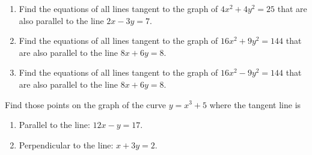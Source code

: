 \begin{embeddedproblem-enumerate}
  \begin{enumerate}[label={\bf{}(\alph*)}]
  \item Find the equations of all lines tangent to the graph of
    $4x^2+4y^2=25$ that are also parallel to the line $2x-3y=7$.\\
  \item   Find the equations of all lines tangent to the graph of
    $16x^2+9y^2=144$ that are also parallel to the line $8x+6y=8.$
  \item   Find the equations of all lines tangent to the graph of
    $16x^2-9y^2=144$ that are also parallel to the line $8x+6y=8.$
  \end{enumerate}
\end{embeddedproblem-enumerate}


\begin{embeddedproblem}
  Find those points on the graph of the curve $y=x^3+5$  where the
  tangent line is
  \begin{enumerate}[label={\bf{}(\alph*)}]
  \item Parallel to the line: $12x-y=17$.
  \item Perpendicular to the line: $x+3y=2$.
  \end{enumerate}
  \vskip-6mm{}
\end{embeddedproblem}

